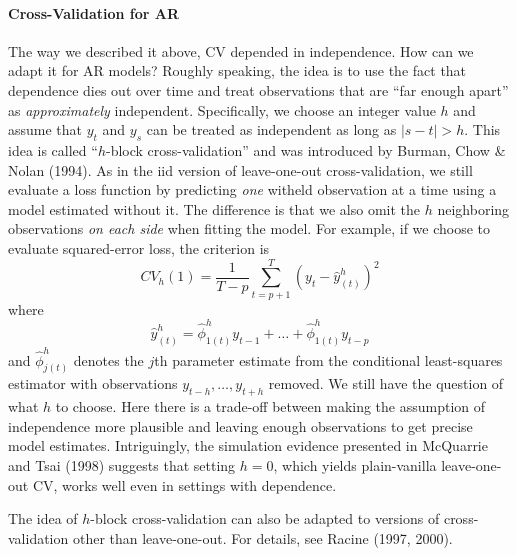 \documentclass[12pt]{article}
\theoremstyle{definition}
\begin{document}
\paragraph{Cross-Validation for AR}
The way we described it above, CV depended in independence. How can we adapt it for AR models? Roughly speaking, the idea is to use the fact that dependence dies out over time and treat observations that are ``far enough apart'' as \emph{approximately} independent. Specifically, we choose an integer value $h$ and assume that $y_t$ and $y_s$ can be treated as independent as long as $|s - t|>h$. This idea is called ``$h$-block cross-validation'' and was introduced by Burman, Chow \& Nolan (1994). As in the iid version of leave-one-out cross-validation, we still evaluate a loss function by predicting \emph{one} witheld observation at a time using a model estimated without it. The difference is that we also omit the $h$ neighboring observations \emph{on each side} when fitting the model. For example, if we choose to evaluate squared-error loss, the criterion is
	$$CV_h(1) = \frac{1}{T-p}\sum_{t = p+1}^T \left(y_t - \hat{y}_{(t)}^h\right)^2$$
where 
$$\hat{y}^h_{(t)} = \hat{\phi}^h_{1(t)} y_{t-1} + \hdots + \hat{\phi}^h_{1(t)}y_{t-p}$$
and $\hat{\phi}^h_{j(t)}$ denotes the $j$th parameter estimate from the conditional least-squares estimator with observations $y_{t-h}, \hdots,  y_{t+h}$ removed. We still have the question of what $h$ to choose. Here there is a trade-off between making the assumption of independence more plausible and leaving enough observations to get precise model estimates. Intriguingly, the simulation evidence presented in McQuarrie and Tsai (1998) suggests that setting $h=0$, which yields plain-vanilla leave-one-out CV, works well even in settings with dependence.

The idea of $h$-block cross-validation can also be adapted to versions of cross-validation other than leave-one-out. For details, see Racine (1997, 2000).
\end{document}
